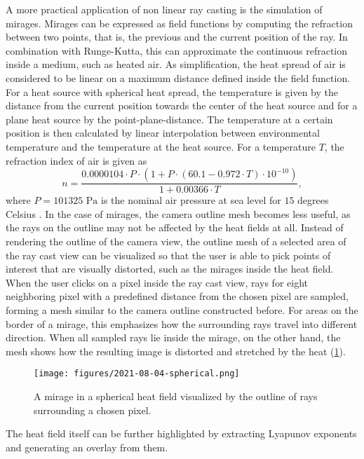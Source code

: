 A more practical application of non linear ray casting is the simulation of mirages.
Mirages can be expressed as field functions by computing the refraction between two points, that is, the previous and the current position of the ray.
In combination with Runge-Kutta, this can approximate the continuous refraction inside a medium, such as heated air.
As simplification, the heat spread of air is considered to be linear on a maximum distance defined inside the field function.
For a heat source with spherical heat spread, the temperature is given by the distance from the current position towards the center of the heat source and for a plane heat source by the point-plane-distance.
The temperature at a certain position is then calculated by linear interpolation between environmental temperature and the temperature at the heat source.
For a temperature $T$, the refraction index of air is given as
\begin{equation}
    n = \frac{0.0000104 \cdot P \cdot (1 + P \cdot (60.1 - 0.972 \cdot T) \cdot 10^{-10})}{1 + 0.00366 \cdot T} ,
\end{equation}
where $P = 101325 \text{ Pa}$ is the nominal air pressure at sea level for $15$ degrees Celsius \cite{zhaoVisualSimulationHeat2007}.
In the case of mirages, the camera outline mesh becomes less useful, as the rays on the outline may not be affected by the heat fields at all.
Instead of rendering the outline of the camera view, the outline mesh of a selected area of the ray cast view can be visualized so that the user is able to pick points of interest that are visually distorted, such as the mirages inside the heat field.
When the user clicks on a pixel inside the ray cast view, rays for eight neighboring pixel with a predefined distance from the chosen pixel are sampled, forming a mesh similar to the camera outline constructed before.
For areas on the border of a mirage, this emphasizes how the surrounding rays travel into different direction.
When all sampled rays lie inside the mirage, on the other hand, the mesh shows how the resulting image is distorted and stretched by the heat (\cref{fig:mirage-spherical-linear}).
\begin{figure}[!t]
  \centering
  \texttt{[image: figures/2021-08-04-spherical.png]}
  \caption{A mirage in a spherical heat field visualized by the outline of rays surrounding a chosen pixel.}
  \label{fig:mirage-spherical-linear}
\end{figure}
The heat field itself can be further highlighted by extracting Lyapunov exponents and generating an overlay from them.
